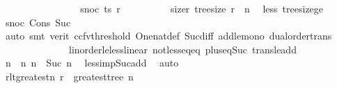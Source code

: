 \begin{isabellebody}
\ \ \ \ \ \ \isamarkupfalse%
\isanewline
\ \ \ \ \ \ \ \ \isamarkupfalse%
\ {\isacharparenleft}{\kern0pt}snoc\ ts{\isacharprime}{\kern0pt}\ r{}{\isacharparenright}{\kern0pt}\isanewline
\ \ \ \ \ \ \ \ \isamarkupfalse%
\ size{\isacharunderscore}{\kern0pt}r{}{\isacharcolon}{\kern0pt}\ {\isachardoublequoteopen}tree{\isacharunderscore}{\kern0pt}size\ r{}\ {\isacharless}{\kern0pt}\ n{\isacharprime}{\kern0pt}{\isachardoublequoteclose}\ \isamarkupfalse%
\ less{\isacharparenleft}{\kern0pt}{}{\isacharparenright}{\kern0pt}\ tree{\isacharunderscore}{\kern0pt}size{\isacharunderscore}{\kern0pt}ge{\isacharunderscore}{\kern0pt}{}\ \isamarkupfalse%
\ snoc\ Cons\ Suc\isanewline
\ \ \ \ \ \ \ \ \ \ \isamarkupfalse%
\ {\isacharparenleft}{\kern0pt}auto{\isacharcomma}{\kern0pt}\ smt\ {\isacharparenleft}{\kern0pt}verit{\isacharcomma}{\kern0pt}\ ccfv{\isacharunderscore}{\kern0pt}threshold{\isacharparenright}{\kern0pt}\ One{\isacharunderscore}{\kern0pt}nat{\isacharunderscore}{\kern0pt}def\ Suc{\isacharunderscore}{\kern0pt}diff{\isacharunderscore}{\kern0pt}{}\ add{\isacharunderscore}{\kern0pt}le{\isacharunderscore}{\kern0pt}mono\ dual{\isacharunderscore}{\kern0pt}order{\isachardot}{\kern0pt}trans\isanewline
\ \ \ \ \ \ \ \ \ \ \ \ \ \ linorder{\isacharunderscore}{\kern0pt}le{\isacharunderscore}{\kern0pt}less{\isacharunderscore}{\kern0pt}linear\ not{\isacharunderscore}{\kern0pt}less{\isacharunderscore}{\kern0pt}eq{\isacharunderscore}{\kern0pt}eq\ plus{\isacharunderscore}{\kern0pt}{}{\isacharunderscore}{\kern0pt}eq{\isacharunderscore}{\kern0pt}Suc\ trans{\isacharunderscore}{\kern0pt}le{\isacharunderscore}{\kern0pt}add{}{\isacharparenright}{\kern0pt}\isanewline
\ \ \ \ \ \ \ \ \isamarkupfalse%
\ \isamarkupfalse%
\ n{\isacharprime}{\kern0pt}{\isacharprime}{\kern0pt}\ \ n{\isacharprime}{\kern0pt}{\isacharprime}{\kern0pt}{\isacharcolon}{\kern0pt}\ {\isachardoublequoteopen}n{\isacharprime}{\kern0pt}\ {\isacharequal}{\kern0pt}\ Suc\ n{\isacharprime}{\kern0pt}{\isacharprime}{\kern0pt}{\isachardoublequoteclose}\ \isamarkupfalse%
\ less{\isacharunderscore}{\kern0pt}imp{\isacharunderscore}{\kern0pt}Suc{\isacharunderscore}{\kern0pt}add\ \isamarkupfalse%
\ auto\isanewline
\ \ \ \ \ \ \ \ \isamarkupfalse%
\ \isamarkupfalse%
\ r{}{\isacharunderscore}{\kern0pt}lt{\isacharunderscore}{\kern0pt}greatest{\isacharunderscore}{\kern0pt}n{\isacharprime}{\kern0pt}{\isacharcolon}{\kern0pt}\ {\isachardoublequoteopen}r{}\ {\isacharless}{\kern0pt}\ greatest{\isacharunderscore}{\kern0pt}tree\ n{\isacharprime}{\kern0pt}{\isachardoublequoteclose}\ \isamarkupfalse%

\end{isabellebody}
